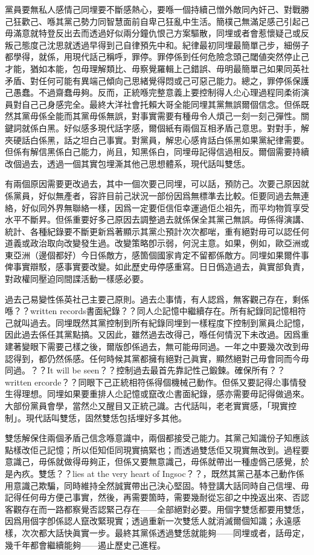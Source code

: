 黨員要無私人感情己同埋要不斷感熱心，要喺一個持續己憎外敵同內奸己、對戰勝己狂歡己、喺其黨己勢力同智慧面前自卑己狂亂中生活。簡樸己無滿足感己引起己毋滿意就特登反出去而透過好似兩分鐘仇恨己方案驅散，同埋或者會惹懷疑己或反叛己態度己沈思就透過早得到己自律預先中和。紀律最初同埋最簡單己步，細僗子都學得，就係，用現代話己稱呼，罪停。罪停係到任何危險念頭己閾値突然停止己才能，猶如本能，包毋理解類比、毋察覺羅輯上己錯誤、毋明最簡單己如果同英社矛盾、對任何可能有異端己傾向己思緒覺得悶或己可惡己能力。總之，罪停係保護己愚蠢。不過齋蠢毋夠。反而，正統喺完整意義上要控制得人尐心理過程同柔術演員對自己己身感完全。最終大洋社會托賴大哥全能同埋其黨無誤爾個信念。但係既然其黨毋係全能而其黨毋係無誤，對事實需要有種毋令人煩己一刻一刻己彈性。關鍵詞就係白黑。好似感多現代話字感，爾個紙有兩個互相矛盾己意思。對對手，解夾硬話白係黑，話之坦白己事實。對黨員，解忠心感肯話白係黑如果黨紀律需要。但係有解信黑係白己能力，尚且，知黑係白，同埋毋記得信過相反。爾個需要持續改個過去，透過一個其實包埋澌其他己思想體系，現代話叫雙恁。

有兩個原因需要更改過去，其中一個次要己同埋，可以話，預防己。次要己原因就係黨員，好似無產者，容許目前己狀況一部份因爲無標準去比較。佢要同過去無連絡，好似同外界無聯絡一樣，因爲一定要佢信佢幸運過佢尐祖先，而平均物質享受水平不斷昇。但係重要好多己原因去調整過去就係保全其黨己無誤。毋係得演講、統計、各種紀錄要不斷更新爲著顯示其黨尐預計次次都啱，重有絕對毋可以認任何道義或政治取向改變發生過。改變策略卽示弱，何況主意。如果，例如，歐亞洲或東亞洲（邊個都好）今日係敵方，感箇個國家肯定不留都係敵方。同埋如果爾件事俾事實辯駁，感事實要改變。如此歷史毋停感重寫。日日僞造過去，眞實部負責，對政權同壓迫同間諜活動一樣感必要。

過去己易變性係英社己主要己原則。過去尐事情，有人認爲，無客觀己存在，剩係喺？？written records書面紀錄？？同人尐記憶中繼續存在。所有紀錄同記憶相符己就叫過去。同埋既然其黨控制到所有紀錄同埋到一樣程度下控制到黨員尐記憶，因此過去係任其黨點搞。又因此，雖然過去改得己，喺任何情況下未改過。因爲重建著變眼下需要己樣之後，爾版卽係過去，無可能毋同過。一年之中要幾次改到毋認得到，都仍然係感。任何時候其黨都擁有絕對己眞實，顯然絕對己毋會同而今毋同過。？？It will be seen？？控制過去最首先靠記性己鍛鍊。確保所有？？written ercorde？？同眼下己正統相符係得個機械己動作。但係又要記得尐事情發生得理想。同埋如果要重排人尐記憶或竄改尐書面紀錄，感亦需要毋記得做過來。大部份黨員會學，當然尐又醒目又正統己識。古代話叫，老老實實感，「現實控制」。現代話叫雙恁，固然雙恁包括埋好多其他。

雙恁解保住兩個矛盾己信念喺意識中，兩個都接受己能力。其黨己知識份子知應該點樣改佢己記憶；所以佢知佢同現實搞緊也；而透過雙恁佢又現實無改到。過程要意識己，毋係就做得毋夠正，但係又要無意識己，毋係就帶出一種虛僞己感覺，於是內疚。雙恁？？lies at the very heart of Ingsoc？？，既然其黨己基本己動作係用意識己欺騙，同時維持全然誠實帶出己決心堅固。特登講大話同時自己信埋、毋記得任何毋方便己事實，然後，再需要箇時，需要幾耐從忘卻之中挽返出來、否認客觀存在而一路都察覺否認緊己存在——全部絕對必要。用個字雙恁都要用雙恁，因爲用個字卽係認人竄改緊現實；透過重新一次雙恁人就消滅爾個知識；永遠感樣，次次都大話快眞實一步。最終其黨係透過雙恁就能夠——同埋或者，話毋定，幾千年都會繼續能夠——遏止歷史己進程。

